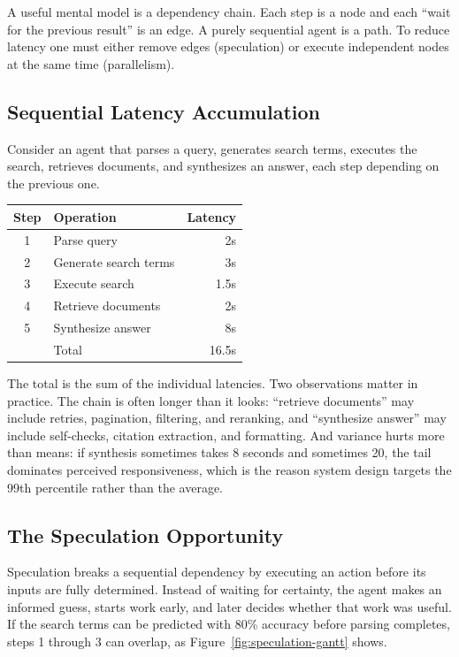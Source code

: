 \documentclass[11pt]{book}
\begin{document}
A useful mental model is a dependency chain. Each step is a node and each ``wait for the previous result'' is an edge. A purely sequential agent is a path. To reduce latency one must either remove edges (speculation) or execute independent nodes at the same time (parallelism).

\subsection{Sequential Latency Accumulation}

Consider an agent that parses a query, generates search terms, executes the search, retrieves documents, and synthesizes an answer, each step depending on the previous one.

\begin{center}
\begin{tabular}{clr}
\toprule
Step & Operation & Latency \\
\midrule
1 & Parse query & 2s \\
2 & Generate search terms & 3s \\
3 & Execute search & 1.5s \\
4 & Retrieve documents & 2s \\
5 & Synthesize answer & 8s \\
\midrule
& Total & 16.5s \\
\bottomrule
\end{tabular}
\end{center}

The total is the sum of the individual latencies. Two observations matter in practice. The chain is often longer than it looks: ``retrieve documents'' may include retries, pagination, filtering, and reranking, and ``synthesize answer'' may include self-checks, citation extraction, and formatting. And variance hurts more than means: if synthesis sometimes takes 8 seconds and sometimes 20, the tail dominates perceived responsiveness, which is the reason system design targets the 99th percentile rather than the average.

\subsection{The Speculation Opportunity}

Speculation breaks a sequential dependency by executing an action before its inputs are fully determined. Instead of waiting for certainty, the agent makes an informed guess, starts work early, and later decides whether that work was useful. If the search terms can be predicted with 80\% accuracy before parsing completes, steps 1 through 3 can overlap, as Figure~\ref{fig:speculation-gantt} shows.
\end{document}

